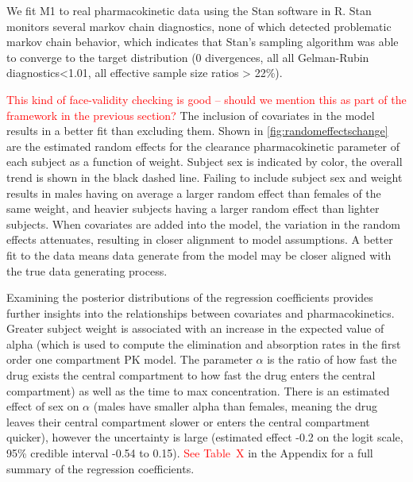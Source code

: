 We fit M1 to real pharmacokinetic data using the Stan software in R\cite{}.  Stan monitors several markov chain diagnostics, none of which detected problematic markov chain behavior, which indicates that Stan’s sampling algorithm was able to converge to the target distribution (0 divergences, all all Gelman-Rubin diagnostics<1.01, all effective sample size ratios  > 22\%).  

\textcolor{red}{This kind of face-validity checking is good -- should we mention this as part of the framework in the previous section?} The inclusion of covariates in the model results in a better fit than excluding them. Shown in \cref{fig:randomeffectschange} are the estimated random effects for the clearance pharmacokinetic parameter of each subject as a function of weight.  Subject sex is indicated by color, the overall trend is shown in the black dashed line.  Failing to include subject sex and weight results in males having on average a larger random effect than females of the same weight, and heavier subjects having a larger random effect than lighter subjects.  When covariates are added into the model, the variation in the random effects attenuates, resulting in closer alignment to model assumptions. A better fit to the data means data generate from the model may be closer aligned with the true data generating process.

Examining the posterior distributions of the regression coefficients provides further insights into the relationships between covariates and pharmacokinetics.  Greater subject weight is associated with an increase in the expected value of alpha (which is used to compute the elimination and absorption rates in the first order one compartment PK model.  The parameter $ \alpha $ is the ratio of how fast the drug exists the central compartment to how fast the drug enters the central compartment) as well as the time to max concentration.  There is an estimated effect of sex on $ \alpha $ (males have smaller alpha than females, meaning the drug leaves their central compartment slower or enters the central compartment quicker), however the uncertainty is large (estimated effect -0.2 on the logit scale, 95\% credible interval -0.54 to 0.15). \textcolor{red}{See Table~X} in the Appendix for a full summary of the regression coefficients.


